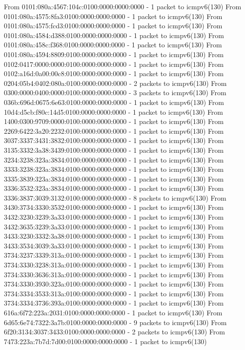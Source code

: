    From 0101:080a:4567:104c:0100:0000:0000:0000 - 1 packet to icmpv6(130)
   From 0101:080a:4575:8fa3:0100:0000:0000:0000 - 1 packet to icmpv6(130)
   From 0101:080a:4575:fcd3:0100:0000:0000:0000 - 1 packet to icmpv6(130)
   From 0101:080a:4584:d388:0100:0000:0000:0000 - 1 packet to icmpv6(130)
   From 0101:080a:458c:f368:0100:0000:0000:0000 - 1 packet to icmpv6(130)
   From 0101:080a:4594:8809:0100:0000:0000:0000 - 1 packet to icmpv6(130)
   From 0102:0417:0000:0000:0100:0000:0000:0000 - 1 packet to icmpv6(130)
   From 0102:a16d:0a00:00c8:0100:0000:0000:0000 - 1 packet to icmpv6(130)
   From 0204:05b4:0402:080a:0100:0000:0000:0000 - 2 packets to icmpv6(130)
   From 0300:0000:0400:0000:0100:0000:0000:0000 - 3 packets to icmpv6(130)
   From 036b:696d:0675:6e63:0100:0000:0000:0000 - 1 packet to icmpv6(130)
   From 10d4:d5cb:f80c:14d5:0100:0000:0000:0000 - 1 packet to icmpv6(130)
   From 1400:0300:9709:0000:0100:0000:0000:0000 - 1 packet to icmpv6(130)
   From 2269:6422:3a20:2232:0100:0000:0000:0000 - 1 packet to icmpv6(130)
   From 3037:3337:3431:3832:0100:0000:0000:0000 - 1 packet to icmpv6(130)
   From 3135:3332:3a38:3439:0100:0000:0000:0000 - 1 packet to icmpv6(130)
   From 3234:3238:323a:3834:0100:0000:0000:0000 - 1 packet to icmpv6(130)
   From 3333:3238:323a:3834:0100:0000:0000:0000 - 1 packet to icmpv6(130)
   From 3335:3839:323a:3834:0100:0000:0000:0000 - 1 packet to icmpv6(130)
   From 3336:3532:323a:3834:0100:0000:0000:0000 - 1 packet to icmpv6(130)
   From 3336:3837:3039:3132:0100:0000:0000:0000 - 8 packets to icmpv6(130)
   From 3430:3734:3330:3532:0100:0000:0000:0000 - 1 packet to icmpv6(130)
   From 3432:3230:3239:3a33:0100:0000:0000:0000 - 1 packet to icmpv6(130)
   From 3432:3635:3239:3a33:0100:0000:0000:0000 - 1 packet to icmpv6(130)
   From 3433:3230:3332:3a38:0100:0000:0000:0000 - 1 packet to icmpv6(130)
   From 3433:3534:3039:3a33:0100:0000:0000:0000 - 1 packet to icmpv6(130)
   From 3734:3237:3339:313a:0100:0000:0000:0000 - 1 packet to icmpv6(130)
   From 3734:3330:3238:313a:0100:0000:0000:0000 - 1 packet to icmpv6(130)
   From 3734:3330:3636:313a:0100:0000:0000:0000 - 1 packet to icmpv6(130)
   From 3734:3330:3930:323a:0100:0000:0000:0000 - 1 packet to icmpv6(130)
   From 3734:3334:3533:313a:0100:0000:0000:0000 - 1 packet to icmpv6(130)
   From 3734:3334:3736:393a:0100:0000:0000:0000 - 1 packet to icmpv6(130)
   From 616a:6f72:223a:2031:0100:0000:0000:0000 - 1 packet to icmpv6(130)
   From 6d65:6e74:7322:3a7b:0100:0000:0000:0000 - 9 packets to icmpv6(130)
   From 6f20:3134:3037:3433:0100:0000:0000:0000 - 2 packets to icmpv6(130)
   From 7473:223a:7b7d:7d00:0100:0000:0000:0000 - 1 packet to icmpv6(130)
